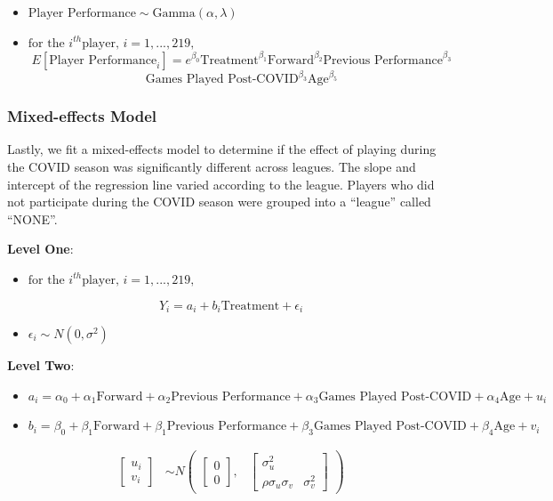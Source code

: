 \documentclass[12pt]{article}
\providecommand{\tightlist}{%
  \setlength{\itemsep}{0pt}\setlength{\parskip}{0pt}}
\begin{document}
\begin{itemize}
\tightlist
\item
  \(\text{Player Performance} \sim \text{Gamma}(\alpha, \lambda)\)
\item
  \(\text{for the }i^{th} \text{player, } i= 1,..., 219,\)
  \[E[\text{Player Performance}_{i}] =  e^{\beta_0} \text{Treatment}^{\beta_1}  \text{Forward}^{\beta_2} \text{Previous Performance}^{\beta_3}\]
  \[\text{Games Played Post-COVID}^{\beta_3} \text{Age}^{\beta_5}\]
\end{itemize}

\hypertarget{mixed-effects-model}{%
\subsubsection{Mixed-effects Model}\label{mixed-effects-model}}

Lastly, we fit a mixed-effects model to determine if the effect of
playing during the COVID season was significantly different across
leagues. The slope and intercept of the regression line varied according
to the league. Players who did not participate during the COVID season
were grouped into a ``league'' called ``NONE''.

\textbf{Level One}:

\begin{itemize}
\tightlist
\item
  \(\text{for the }i^{th} \text{player, } i= 1,..., 219,\)
\end{itemize}

\[Y_i = a_i + b_i\text{Treatment} + \epsilon_i\]

\begin{itemize}
\tightlist
\item
  \(\epsilon_i \sim N(0, \sigma^2)\)
\end{itemize}

\textbf{Level Two}:

\begin{itemize}
\item
  \(a_i = \alpha_0 + \alpha_1\text{Forward} + \alpha_2\text{Previous Performance} + \alpha_3\text{Games Played Post-COVID} + \alpha_4\text{Age} + u_i\)
\item
  \(b_i = \beta_0 + \beta_1\text{Forward} + \beta_1\text{Previous Performance} + \beta_3\text{Games Played Post-COVID} + \beta_4\text{Age} + v_i\)
\end{itemize}

\begin{align*}
\begin{bmatrix}u_{i}\\
v_{i}
\end{bmatrix} &\sim  N
\begin{pmatrix}
\begin{bmatrix}
0\\
0
\end{bmatrix}\!\!,&
\begin{bmatrix}
\sigma_{u}^2 & \\
\rho\sigma_{u}\sigma_{v} & \sigma_{v}^2
\end{bmatrix}
\end{pmatrix}
\end{align*}
\end{document}
